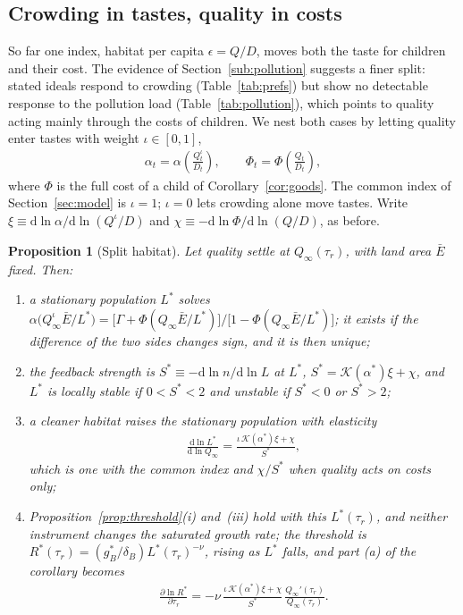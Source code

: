 \documentclass[11pt]{article}
\newtheorem{proposition}{Proposition}
\begin{document}
\subsection{Crowding in tastes, quality in costs}
\label{sub:split}
So far one index, habitat per capita $\epsilon=Q/D$, moves both the taste for children and their cost.
The evidence of Section~\ref{sub:pollution} suggests a finer split: stated ideals respond to crowding (Table~\ref{tab:prefs}) but show no detectable response to the
pollution load (Table~\ref{tab:pollution}), which points to quality acting mainly through
the costs of children. We nest both cases by letting quality enter tastes with weight $\iota\in[0,1]$,
\begin{align}
\alpha_t=\alpha\!\left(\frac{Q_t^{\iota}}{D_t}\right),
\qquad
\Phi_t=\Phi\!\left(\frac{Q_t}{D_t}\right),
\label{eq:split}
\end{align}
where $\Phi$ is the full cost of a child of Corollary~\ref{cor:goods}. The common index of
Section~\ref{sec:model} is $\iota=1$; $\iota=0$ lets crowding alone move tastes. Write
$\xi\equiv\mathrm{d}\ln\alpha/\mathrm{d}\ln(Q^{\iota}/D)$ and $\chi\equiv-\mathrm{d}\ln\Phi/\mathrm{d}\ln(Q/D)$, as
before.

\begin{proposition}[Split habitat]
\label{prop:split}
Let quality settle at $Q_\infty(\tau_r)$, with land area $\bar E$ fixed. Then:
\begin{enumerate}
\item[(i)] a stationary population $L^\ast$ solves
$\alpha\big(Q_\infty^{\iota}\bar E/L^\ast\big)=\big[\Gamma+\Phi(Q_\infty\bar E/L^\ast)\big]/
\big[1-\Phi(Q_\infty\bar E/L^\ast)\big]$; it exists if the difference of the two sides changes sign, and it
is then unique;
\item[(ii)] the feedback strength is $S^\ast\equiv-\mathrm{d}\ln n/\mathrm{d}\ln L$ at $L^\ast$,
$S^\ast=\mathcal{K}(\alpha^\ast)\xi+\chi$, and $L^\ast$ is locally stable if $0<S^\ast<2$ and unstable if $S^\ast<0$ or $S^\ast>2$;
\item[(iii)] a cleaner habitat raises the stationary population with elasticity
\begin{align}
\frac{\mathrm{d}\ln L^\ast}{\mathrm{d}\ln Q_\infty}=\frac{\iota\,\mathcal{K}(\alpha^\ast)\xi+\chi}{S^\ast},
\label{eq:dLdQ}
\end{align}
which is one with the common index and $\chi/S^\ast$ when quality acts on costs only;
\item[(iv)] Proposition~\ref{prop:threshold}(i) and~(iii) hold with this $L^\ast(\tau_r)$, and neither
instrument changes the saturated growth rate; the threshold is $R^\ast(\tau_r)=(g_B^\ast/\delta_B)L^\ast(\tau_r)^{-\nu}$, rising as
$L^\ast$ falls, and part (a) of the corollary becomes
\begin{align*}
\frac{\partial\ln R^\ast}{\partial\tau_r}=-\nu\,\frac{\iota\,\mathcal{K}(\alpha^\ast)\xi+\chi}{S^\ast}\,
\frac{Q_\infty'(\tau_r)}{Q_\infty(\tau_r)}.
\end{align*}
\end{enumerate}
\end{proposition}
\end{document}
